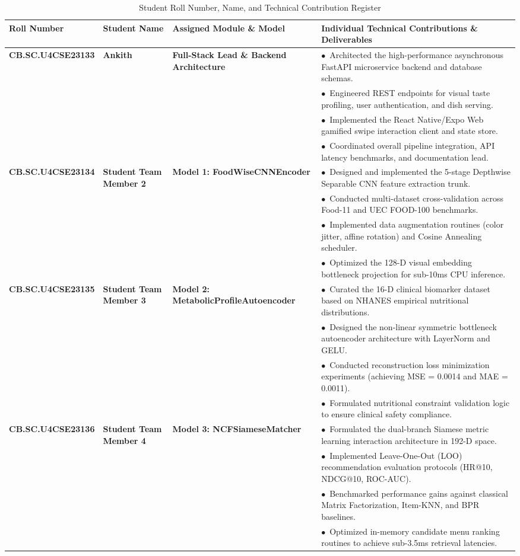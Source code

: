 \documentclass[10pt,journal,compsoc]{IEEEtran}
\begin{document}
\begin{table}[!ht]
\centering
\caption{Student Roll Number, Name, and Technical Contribution Register}
\label{tab:team_contrib}
\begin{tabularx}{\textwidth}{llXX}
\toprule
\textbf{Roll Number} & \textbf{Student Name} & \textbf{Assigned Module \& Model} & \textbf{Individual Technical Contributions \& Deliverables} \\
\midrule
\textbf{CB.SC.U4CSE23133} & \textbf{Ankith} & \textbf{Full-Stack Lead \& Backend Architecture} & 
$\bullet$~Architected the high-performance asynchronous FastAPI microservice backend and database schemas.\\
& & & $\bullet$~Engineered REST endpoints for visual taste profiling, user authentication, and dish serving.\\
& & & $\bullet$~Implemented the React Native/Expo Web gamified swipe interaction client and state store.\\
& & & $\bullet$~Coordinated overall pipeline integration, API latency benchmarks, and documentation lead.\\
\midrule
\textbf{CB.SC.U4CSE23134} & \textbf{Student Team Member 2} & \textbf{Model 1: FoodWiseCNNEncoder} & 
$\bullet$~Designed and implemented the 5-stage Depthwise Separable CNN feature extraction trunk.\\
& & & $\bullet$~Conducted multi-dataset cross-validation across Food-11 and UEC FOOD-100 benchmarks.\\
& & & $\bullet$~Implemented data augmentation routines (color jitter, affine rotation) and Cosine Annealing scheduler.\\
& & & $\bullet$~Optimized the 128-D visual embedding bottleneck projection for sub-10ms CPU inference.\\
\midrule
\textbf{CB.SC.U4CSE23135} & \textbf{Student Team Member 3} & \textbf{Model 2: MetabolicProfileAutoencoder} & 
$\bullet$~Curated the 16-D clinical biomarker dataset based on NHANES empirical nutritional distributions.\\
& & & $\bullet$~Designed the non-linear symmetric bottleneck autoencoder architecture with LayerNorm and GELU.\\
& & & $\bullet$~Conducted reconstruction loss minimization experiments (achieving MSE = 0.0014 and MAE = 0.0011).\\
& & & $\bullet$~Formulated nutritional constraint validation logic to ensure clinical safety compliance.\\
\midrule
\textbf{CB.SC.U4CSE23136} & \textbf{Student Team Member 4} & \textbf{Model 3: NCFSiameseMatcher} & 
$\bullet$~Formulated the dual-branch Siamese metric learning interaction architecture in 192-D space.\\
& & & $\bullet$~Implemented Leave-One-Out (LOO) recommendation evaluation protocols (HR@10, NDCG@10, ROC-AUC).\\
& & & $\bullet$~Benchmarked performance gains against classical Matrix Factorization, Item-KNN, and BPR baselines.\\
& & & $\bullet$~Optimized in-memory candidate menu ranking routines to achieve sub-3.5ms retrieval latencies.\\
\bottomrule
\end{tabularx}
\end{table}
\end{document}

